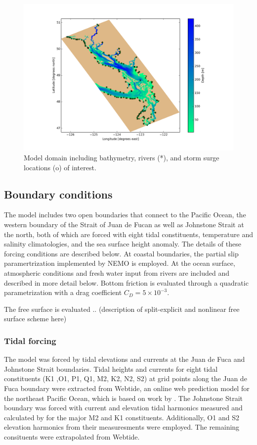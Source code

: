 \documentclass[pdftex,12pt]{article}
\begin{document}
\begin{figure}[h]
\centering
\includegraphics[scale=0.5]{Figures/bathy.png}
\caption{Model domain including bathymetry, rivers (*), and storm surge locations (o) of interest.}\label{fig:domain}
\end{figure}

\subsection{Boundary conditions}
The model includes two open boundaries that connect to the Pacific Ocean, the western boundary of the Strait of Juan de Fucan as well as Johnstone Strait at the north, both of which are forced with eight tidal constituents, temperature and salinity climatologies, and the sea surface height anomaly. The details of these forcing conditions are described below. At coastal boundaries, the partial slip paramertrization implemented by NEMO \citep{madec2008nemo} is employed. At the ocean surface, atmospheric conditions and fresh water input from rivers are included and described in more detail below. Bottom friction is evaluated through a quadratic parametrization \citep{madec2008nemo} with a drag coefficient $C_D = 5\times 10^{-3}$. 

The free surface is evaluated .. (description of split-explicit and nonlinear free surface scheme here) 


\subsubsection{Tidal forcing} 
The model was forced by tidal elevations and currents at the Juan de Fuca and Johnstone Strait boundaries. Tidal heights and currents for eight tidal constituents (K1 ,O1, P1, Q1, M2, K2, N2, S2) at grid points along the Juan de Fuca boundary were extracted from Webtide, an online web prediction model for the northeast Pacific Ocean, which is based on work by \citet{foreman2000webtide}. The Johnstone Strait boundary was forced with current and elevation tidal harmonics measured and calculated by \citet{thomson1980johnstone} for the major M2 and K1 constituents. Additionally, O1 and S2 elevation harmonics from their measuresments were employed. The remaining consituents were extrapolated from Webtide. 
\end{document}
